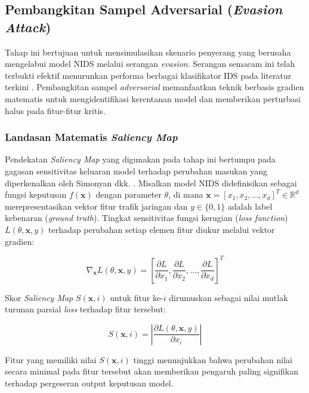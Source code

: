 \documentclass[11pt, a4paper]{article}
\begin{document}
\subsection{Pembangkitan Sampel Adversarial (\textit{Evasion Attack})}
Tahap ini bertujuan untuk mensimulasikan skenario penyerang yang berusaha mengelabui model NIDS melalui serangan \textit{evasion}. Serangan semacam ini telah terbukti efektif menurunkan performa berbagai klasifikator IDS pada literatur terkini \cite{ref_idsgan, ref_attackgan, ref_demgan}. Pembangkitan sampel \textit{adversarial} memanfaatkan teknik berbasis gradien matematis \cite{ref_szegedy} untuk mengidentifikasi kerentanan model dan memberikan perturbasi halus pada fitur-fitur kritis.

\subsubsection{Landasan Matematis \textit{Saliency Map}}
Pendekatan \textit{Saliency Map} yang digunakan pada tahap ini bertumpu pada gagasan sensitivitas keluaran model terhadap perubahan masukan yang diperkenalkan oleh Simonyan dkk. \cite{ref_saliency}. Misalkan model NIDS didefinisikan sebagai fungsi keputusan $f(\mathbf{x})$ dengan parameter $\theta$, di mana $\mathbf{x} = [x_1, x_2, \dots, x_d]^T \in \mathbb{R}^d$ merepresentasikan vektor fitur trafik jaringan dan $y \in \{0, 1\}$ adalah label kebenaran (\textit{ground truth}). Tingkat sensitivitas fungsi kerugian (\textit{loss function}) $L(\theta, \mathbf{x}, y)$ terhadap perubahan setiap elemen fitur diukur melalui vektor gradien:

\begin{equation}
\nabla_{\mathbf{x}} L(\theta, \mathbf{x}, y) = \left[ \frac{\partial L}{\partial x_1}, \frac{\partial L}{\partial x_2}, \dots, \frac{\partial L}{\partial x_d} \right]^T
\end{equation}

Skor \textit{Saliency Map} $S(\mathbf{x}, i)$ untuk fitur ke-$i$ dirumuskan sebagai nilai mutlak turunan parsial \textit{loss} terhadap fitur tersebut:

\begin{equation}
S(\mathbf{x}, i) = \left| \frac{\partial L(\theta, \mathbf{x}, y)}{\partial x_i} \right|
\end{equation}

Fitur yang memiliki nilai $S(\mathbf{x}, i)$ tinggi menunjukkan bahwa perubahan nilai secara minimal pada fitur tersebut akan memberikan pengaruh paling signifikan terhadap pergeseran output keputusan model.
\end{document}
